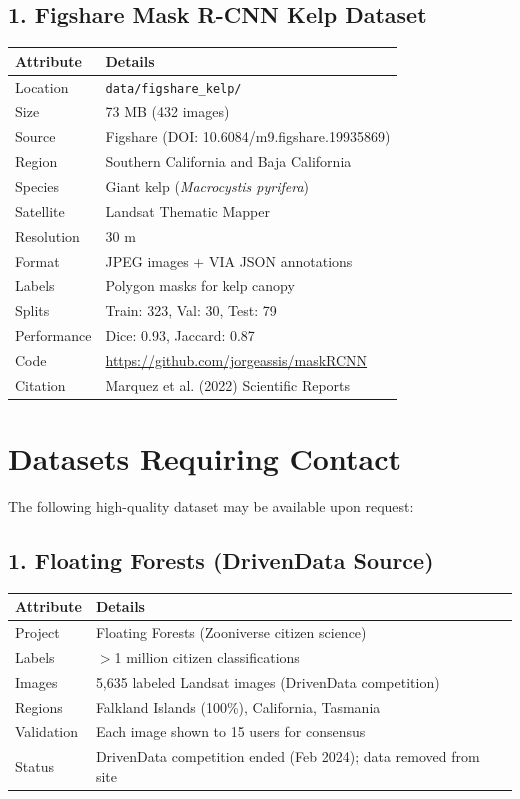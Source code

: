 \documentclass[11pt]{article}
\begin{document}
\subsection{1. Figshare Mask R-CNN Kelp Dataset}

\begin{tabular}{p{4cm}p{10cm}}
\toprule
\textbf{Attribute} & \textbf{Details} \\
\midrule
Location & \texttt{data/figshare\_kelp/} \\
Size & 73 MB (432 images) \\
Source & Figshare (DOI: 10.6084/m9.figshare.19935869) \\
Region & Southern California and Baja California \\
Species & Giant kelp (\textit{Macrocystis pyrifera}) \\
Satellite & Landsat Thematic Mapper \\
Resolution & 30 m \\
Format & JPEG images + VIA JSON annotations \\
Labels & Polygon masks for kelp canopy \\
Splits & Train: 323, Val: 30, Test: 79 \\
Performance & Dice: 0.93, Jaccard: 0.87 \\
Code & \url{https://github.com/jorgeassis/maskRCNN} \\
Citation & Marquez et al. (2022) Scientific Reports \\
\bottomrule
\end{tabular}


\section{Datasets Requiring Contact}

The following high-quality dataset may be available upon request:

\subsection{1. Floating Forests (DrivenData Source)}

\begin{tabular}{p{4cm}p{10cm}}
\toprule
\textbf{Attribute} & \textbf{Details} \\
\midrule
Project & Floating Forests (Zooniverse citizen science) \\
Labels & $>$1 million citizen classifications \\
Images & 5,635 labeled Landsat images (DrivenData competition) \\
Regions & Falkland Islands (100\%), California, Tasmania \\
Validation & Each image shown to 15 users for consensus \\
Status & DrivenData competition ended (Feb 2024); data removed from site \\
\bottomrule
\end{tabular}
\end{document}
